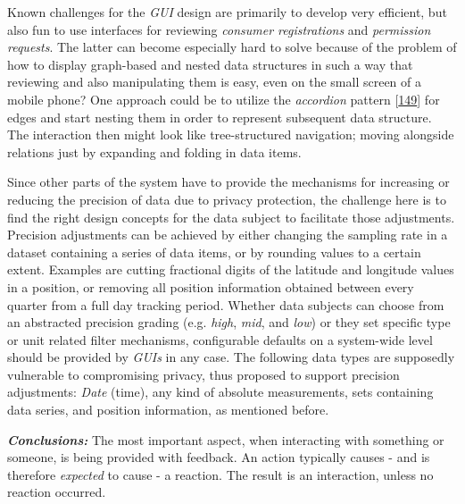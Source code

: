 \documentclass[12pt,english,a4paper,titlepage,cleardoublepage=empty,dottedtoc]{report}
\begin{document}
Known challenges for the \emph{GUI} design are primarily to develop very
efficient, but also fun to use interfaces for reviewing \emph{consumer
registrations} and \emph{permission requests}. The latter can become
especially hard to solve because of the problem of how to display
graph-based and nested data structures in such a way that reviewing and
also manipulating them is easy, even on the small screen of a mobile
phone? One approach could be to utilize the \emph{accordion} pattern
{[}\protect\hyperlink{ref-web_2016_wikipedia_accordion-gui}{149}{]} for
edges and start nesting them in order to represent subsequent data
structure. The interaction then might look like tree-structured
navigation; moving alongside relations just by expanding and folding in
data items.

Since other parts of the system have to provide the mechanisms for
increasing or reducing the precision of data due to privacy protection,
the challenge here is to find the right design concepts for the data
subject to facilitate those adjustments. Precision adjustments can be
achieved by either changing the sampling rate in a dataset containing a
series of data items, or by rounding values to a certain extent.
Examples are cutting fractional digits of the latitude and longitude
values in a position, or removing all position information obtained
between every quarter from a full day tracking period. Whether data
subjects can choose from an abstracted precision grading (e.g.
\emph{high}, \emph{mid}, and \emph{low}) or they set specific type or
unit related filter mechanisms, configurable defaults on a system-wide
level should be provided by \emph{GUIs} in any case. The following data
types are supposedly vulnerable to compromising privacy, thus proposed
to support precision adjustments: \emph{Date} (time), any kind of
absolute measurements, sets containing data series, and position
information, as mentioned before.

\emph{\textbf{Conclusions:}} The most important aspect, when interacting
with something or someone, is being provided with feedback. An action
typically causes - and is therefore \emph{expected} to cause - a
reaction. The result is an interaction, unless no reaction occurred.
\end{document}

